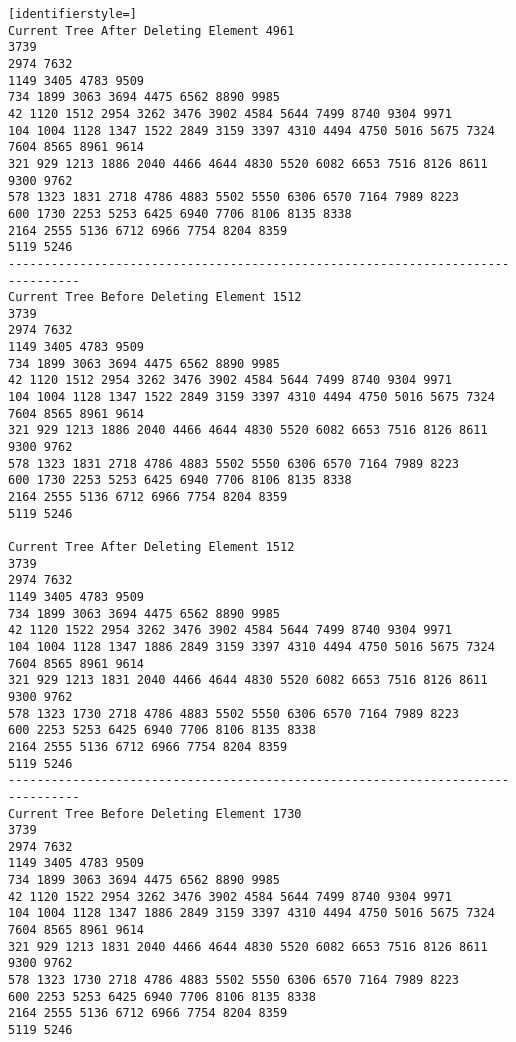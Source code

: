 \documentclass[12pt]{scrartcl}
\begin{document}
\begin{lstlisting}[identifierstyle=]
Current Tree After Deleting Element 4961
3739
2974 7632
1149 3405 4783 9509
734 1899 3063 3694 4475 6562 8890 9985
42 1120 1512 2954 3262 3476 3902 4584 5644 7499 8740 9304 9971
104 1004 1128 1347 1522 2849 3159 3397 4310 4494 4750 5016 5675 7324 7604 8565 8961 9614
321 929 1213 1886 2040 4466 4644 4830 5520 6082 6653 7516 8126 8611 9300 9762
578 1323 1831 2718 4786 4883 5502 5550 6306 6570 7164 7989 8223
600 1730 2253 5253 6425 6940 7706 8106 8135 8338
2164 2555 5136 6712 6966 7754 8204 8359
5119 5246
--------------------------------------------------------------------------------
Current Tree Before Deleting Element 1512
3739
2974 7632
1149 3405 4783 9509
734 1899 3063 3694 4475 6562 8890 9985
42 1120 1512 2954 3262 3476 3902 4584 5644 7499 8740 9304 9971
104 1004 1128 1347 1522 2849 3159 3397 4310 4494 4750 5016 5675 7324 7604 8565 8961 9614
321 929 1213 1886 2040 4466 4644 4830 5520 6082 6653 7516 8126 8611 9300 9762
578 1323 1831 2718 4786 4883 5502 5550 6306 6570 7164 7989 8223
600 1730 2253 5253 6425 6940 7706 8106 8135 8338
2164 2555 5136 6712 6966 7754 8204 8359
5119 5246

Current Tree After Deleting Element 1512
3739
2974 7632
1149 3405 4783 9509
734 1899 3063 3694 4475 6562 8890 9985
42 1120 1522 2954 3262 3476 3902 4584 5644 7499 8740 9304 9971
104 1004 1128 1347 1886 2849 3159 3397 4310 4494 4750 5016 5675 7324 7604 8565 8961 9614
321 929 1213 1831 2040 4466 4644 4830 5520 6082 6653 7516 8126 8611 9300 9762
578 1323 1730 2718 4786 4883 5502 5550 6306 6570 7164 7989 8223
600 2253 5253 6425 6940 7706 8106 8135 8338
2164 2555 5136 6712 6966 7754 8204 8359
5119 5246
--------------------------------------------------------------------------------
Current Tree Before Deleting Element 1730
3739
2974 7632
1149 3405 4783 9509
734 1899 3063 3694 4475 6562 8890 9985
42 1120 1522 2954 3262 3476 3902 4584 5644 7499 8740 9304 9971
104 1004 1128 1347 1886 2849 3159 3397 4310 4494 4750 5016 5675 7324 7604 8565 8961 9614
321 929 1213 1831 2040 4466 4644 4830 5520 6082 6653 7516 8126 8611 9300 9762
578 1323 1730 2718 4786 4883 5502 5550 6306 6570 7164 7989 8223
600 2253 5253 6425 6940 7706 8106 8135 8338
2164 2555 5136 6712 6966 7754 8204 8359
5119 5246


\end{lstlisting}
\end{document}

